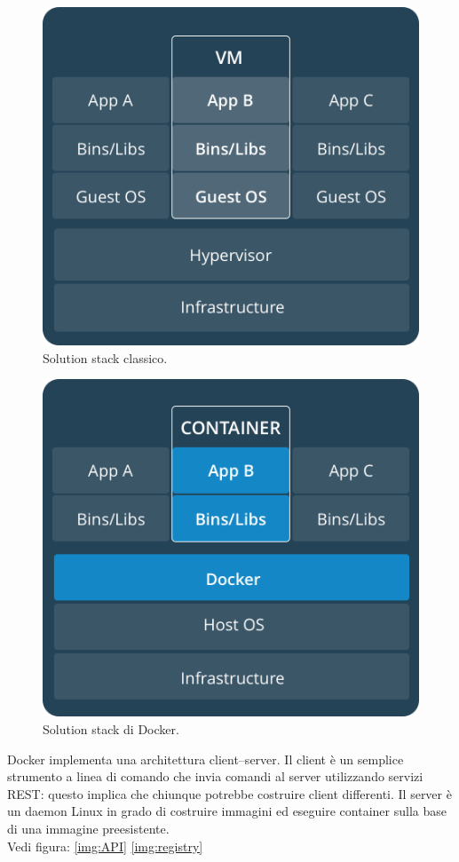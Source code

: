 \begin{figure}[H]
	\begin{center}
		\includegraphics[width=0.70\columnwidth]{img/VM@2x.png}
		\caption{Solution stack classico.}
		\label{img:structDoc1}
	\end{center}
\end{figure}
\begin{figure}[H]
	\begin{center}
		\includegraphics[width=0.70\columnwidth]{img/Container@2x.png}
		\caption{Solution stack di Docker.}
		\label{img:structDoc2}
	\end{center}
\end{figure}
Docker implementa una architettura client–server. Il client è un semplice strumento a linea di comando che invia comandi al server utilizzando servizi REST: questo implica che chiunque potrebbe costruire client differenti. Il server è un daemon Linux in grado di costruire immagini ed eseguire container sulla base di una immagine preesistente.\\Vedi figura: \ref{img:API} \ref{img:registry}
